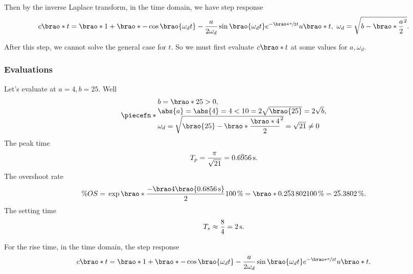\documentclass[12pt]{article}
\newcommand*\siexpr[2][]{\SI[parse-numbers=false,#1]{#2}}%
\DeclarePairedDelimiter\brao()%
\DeclarePairedDelimiter\abs||
\DeclarePairedDelimiter\piecefn\{.
\begin{document}
\begin{enumerate}[(a)]
        Then by the inverse Laplace transform, in the time domain, we have step response
        \begin{equation}
            \begin{aligned}
                c\brao*t = \brao*{1 + \brao*{-\cos\brao{\omega_d t} - \frac{a}{2\omega_d} \sin\brao{\omega_d t} }{e^{-\brao*{\sfrac{a}2}t}}}u\brao*t,\ 
                \omega_d = \sqrt{b - \brao*{\frac{a}2}^2}.
            \end{aligned}
        \end{equation}

        After this step, we cannot solve the general case for $t$. So we must first evaluate $c\brao*t$ at some values for $a, \omega_d$.

        \subsubsection{Evaluations}
        Let's evaluate at $a = 4, b = 25$. Well
        \begin{equation}
            \piecefn*{
                \begin{array}{@{}l@{}}
                    b = \brao*{25} > 0,
                \\*
                    \abs{a} = \abs{4} = 4 < 10 = 2\sqrt{\brao{25}} = 2\sqrt{b},
                \\*
                    \omega_d = \sqrt{\brao{25} - \brao*{\dfrac{\brao*4}2}^2} = \sqrt{21} \not= 0
                \\*
                \end{array}
            }
        \end{equation}
        The peak time
        \begin{equation}
            T_p = \frac\pi{\sqrt{21}} = \siexpr{0.6\overline956}\second.
        \end{equation}
        The overshoot rate
        \begin{equation}
                \% OS
                ={} \exp\brao*{\frac{-\brao4\brao{\SI{0.6856}\second}}2} \SI{100}\percent
                = \brao*{0.2\overline53\,802}{\SI{100}\percent}
                = \siexpr{2\overline5.3802}\percent.
        \end{equation}
        The setting time
        \begin{equation}
            T_s \approx \frac84 = \SI2\second.
        \end{equation}

        For the rise time, in the time domain, the step response
        \begin{equation}
            \begin{aligned}
                c\brao*t = \brao*{1 + \brao*{-\cos\brao{\omega_d t} - \frac{a}{2\omega_d} \sin\brao{\omega_d t} }{e^{-\brao*{\sfrac{a}2}t}}}u\brao*t.
            \end{aligned}
        \end{equation}


\end{enumerate}
\end{document}
